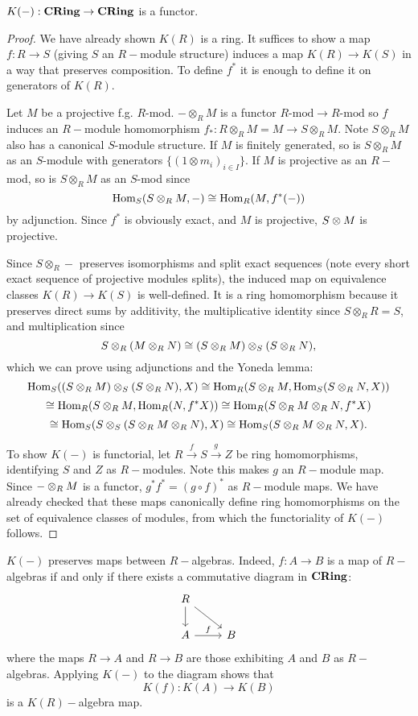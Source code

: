 \begin{lemma}
$K(-):{\normalfont\textbf{CRing}}\rightarrow {\normalfont\textbf{CRing}}$ is a functor.
\end{lemma}
\begin{proof}
We have already shown $K(R)$ is a ring. It suffices to show a map $f:R\rightarrow S$ (giving $S$ an $R-$module structure) induces a map $K(R)\rightarrow K(S)$ in a way that preserves composition. To define $f^*$ it is enough to define it on generators of $K(R)$.

Let $M$ be a projective f.g. $R$-mod. $-\otimes_RM$ is a functor $R\text{-mod}\rightarrow R\text{-mod}$ so $f$ induces an $R-$module homomorphism $f_*:R\otimes_RM=M\rightarrow S\otimes_R M$. Note $S\otimes_R M$ also has a canonical $S$-module structure. If $M$ is finitely generated, so is $S\otimes_R M$ as an $S$-module with generators $\{(1\otimes m_i)_{i\in I}\}$. If $M$ is projective as an $R-$mod, so is $S\otimes_R M$ as an $S$-mod since
$$\text{Hom}_S(S\otimes_R M, -)\cong \text{Hom}_R(M,f^*(-))$$
by adjunction. Since $f^*$ is obviously exact, and $M$ is projective, $S\otimes M$ is projective.

Since $S\otimes_R -$ preserves isomorphisms and split exact sequences (note every short exact sequence of projective modules splits), the induced map on equivalence classes $K(R)\rightarrow K(S)$ is well-defined. It is a ring homomorphism because it preserves direct sums by additivity, the multiplicative identity since $S\otimes_R R = S$, and multiplication since $$S\otimes_R (M \otimes_R N)\cong  (S\otimes_R M)\otimes_S (S\otimes_R N),$$
which we can prove using adjunctions and the Yoneda lemma:
$$\text{Hom}_S((S\otimes_RM)\otimes_S(S\otimes_RN),X)\cong \text{Hom}_R(S\otimes_RM,\text{Hom}_S(S\otimes_RN,X))$$$$\cong \text{Hom}_R(S\otimes_RM,\text{Hom}_R(N,f^*X))\cong \text{Hom}_R(S\otimes_RM\otimes_RN,f^*X)$$$$\cong \text{Hom}_S(S\otimes_S(S\otimes_RM\otimes_RN),X)\cong \text{Hom}_S(S\otimes_RM\otimes_RN,X).$$

To show $K(-)$ is functorial, let $R\xrightarrow{f}S\xrightarrow{g}Z$ be ring homomorphisms, identifying $S$ and $Z$ as $R-$modules. Note this makes $g$ an $R-$module map. Since $-\otimes_R M$ is a functor, $g^*f^*=(g\circ f)^*$ as $R-$module maps. We have already checked that these maps canonically define ring homomorphisms on the set of equivalence classes of modules, from which the functoriality of $K(-)$ follows.
\end{proof}

\begin{remark}
$K(-)$ preserves maps between $R-$algebras. Indeed, \newline$f:A\rightarrow B$ is a map of $R-$algebras if and only if there exists a commutative diagram in ${\normalfont\textbf{CRing}}$:
\[\begin{tikzcd}
R \arrow[d] \arrow[rd] &   \\
A \arrow[r,"f"]            & B
\end{tikzcd}\]
where the maps $R\rightarrow A$ and $R\rightarrow B$ are those exhibiting $A$ and $B$ as $R-$algebras. Applying $K(-)$ to the diagram shows that $$K(f):K(A)\rightarrow K(B)$$ is a $K(R)-$algebra map.\end{remark}